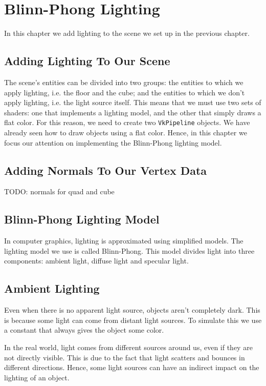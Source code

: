 \chapter{Blinn-Phong Lighting}

In this chapter we add lighting to the scene we set up in the previous chapter.

\section{Adding Lighting To Our Scene}

The scene's entities can be divided into two groups: the entities to which we
apply lighting, i.e. the floor and the cube; and the entities to which we
don't apply lighting, i.e. the light source itself.
This means that we must use two sets of shaders: one that implements a lighting
model, and the other that simply draws a flat color.
For this reason, we need to create two \texttt{VkPipeline} objects.
We have already seen how to draw objects using a flat color.
Hence, in this chapter we focus our attention on implementing the Blinn-Phong
lighting model.

\section{Adding Normals To Our Vertex Data}

TODO: normals for quad and cube

\section{Blinn-Phong Lighting Model}

In computer graphics, lighting is approximated using simplified models.
The lighting model we use is called Blinn-Phong.
This model divides light into three components: ambient light, diffuse light and
specular light.

\section{Ambient Lighting}

Even when there is no apparent light source, objects aren't completely dark.
This is because some light can come from distant light sources.
To simulate this we use a constant that always gives the object some color.

In the real world, light comes from different sources around us, even if they
are not directly visible.
This is due to the fact that light scatters and bounces in different directions.
Hence, some light sources can have an indirect impact on the lighting of an object.

